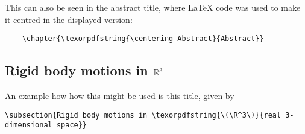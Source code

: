 \vspace{\baselineskip} \noindent
This can also be seen in the abstract title, where \LaTeX{} code was used to make it centred in the displayed version:
\begin{verbatim}
    \chapter{\texorpdfstring{\centering Abstract}{Abstract}}
\end{verbatim}

\subsection{Rigid body motions in \texorpdfstring{\(\mathbb{R}^3\)}{real three dimensional space}}
An example how how this might be used is this title, given by
\begin{verbatim}
\subsection{Rigid body motions in \texorpdfstring{\(\R^3\)}{real 3-dimensional space}}
\end{verbatim}
